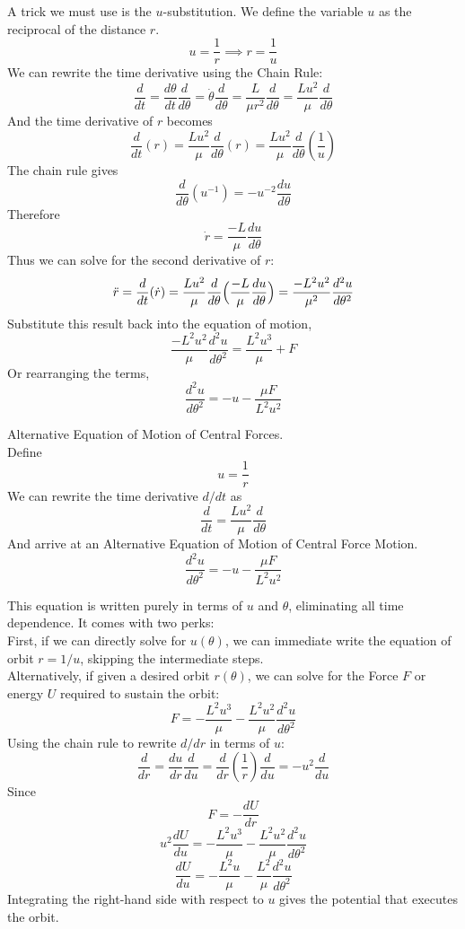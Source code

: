 \documentclass[11pt]{article}
\theoremstyle{gangnamstyle}{\newtheorem{definition}{Definition}[]}
\theoremstyle{gangnamstyle}{\newtheorem{example}{Example}[]}
\theoremstyle{gangnamstyle}{\newtheorem{problem}{Problem}[]}
\theoremstyle{gangnamstyle}{\newtheorem{warning}{Warning}[]}
\begin{document}
A trick we must use is the $u$-substitution. We define the variable $u$ as the reciprocal of the distance $r$. 
\[ u = \frac{1}{r} \implies r = \frac{1}{u} \]
We can rewrite the time derivative using the Chain Rule: 
\[ \frac{d}{dt} = \frac{d\theta}{dt}\frac{d}{d\theta} = \Dot{\theta}\frac{d}{d\theta} = \frac{L}{\mu r^2}\frac{d}{d\theta} = \frac{Lu^2}{\mu}\frac{d}{d\theta} \]
And the time derivative of $r$ becomes
\[ \frac{d}{dt}(r) = \frac{Lu^2}{\mu}\frac{d}{d\theta}(r) = \frac{Lu^2}{\mu}\frac{d}{d\theta}(\frac{1}{u}) \]
The chain rule gives
\[ \frac{d}{d\theta}(u^{-1}) = -u^{-2} \frac{du}{d\theta} \]
Therefore
\[ \Dot{r} = \frac{-L}{\mu}\frac{du}{d\theta} \]
Thus we can solve for the second derivative of $r$: 
\[ \Ddot{r} = \frac{d}{dt}(\Dot{r}) = \frac{Lu^2}{\mu}\frac{d}{d\theta}\Big( \frac{-L}{\mu}\frac{du}{d\theta} \Big) = \frac{-L^2u^2}{\mu^2}\frac{d^2u}{d\theta^2} \]
Substitute this result back into the equation of motion, 
\[ \frac{-L^2u^2}{\mu}\frac{d^2u}{d\theta^2} = \frac{L^2u^3}{\mu} + F \]
Or rearranging the terms,
\[ \frac{d^2u}{d\theta^2} = - u - \frac{\mu F}{L^2u^2} \]

\begin{definition}
Alternative Equation of Motion of Central Forces. \\
Define 
\begin{equation}
u = \frac{1}{r}
\end{equation}
We can rewrite the time derivative $d/dt$ as
\begin{equation}
\frac{d}{dt} = \frac{Lu^2}{\mu}\frac{d}{d\theta}
\end{equation}
And arrive at an Alternative Equation of Motion of Central Force Motion. 
\begin{equation}
\frac{d^2u}{d\theta^2} = - u - \frac{\mu F}{L^2u^2}
\end{equation}
\end{definition}

This equation is written purely in terms of $u$ and $\theta$, eliminating all time dependence. It comes with two perks: \\
First, if we can directly solve for $u(\theta)$, we can immediate write the equation of orbit $r = 1 / u$, skipping the intermediate steps. \\
Alternatively, if given a desired orbit $r(\theta)$, we can solve for the Force $F$ or energy $U$ required to sustain the orbit: 
\[ F = - \frac{L^2u^3}{\mu} -\frac{L^2u^2}{\mu}\frac{d^2u}{d\theta^2} \]
Using the chain rule to rewrite $d/dr$ in terms of $u$:
\[ \frac{d}{dr} = \frac{du}{dr}\frac{d}{du} = \frac{d}{dr}(\frac{1}{r})\frac{d}{du} = -u^2\frac{d}{du} \]
Since
\[ F = - \frac{dU}{dr} \]
\[ u^2\frac{dU}{du} = - \frac{L^2u^3}{\mu} -\frac{L^2u^2}{\mu}\frac{d^2u}{d\theta^2} \]
\[ \frac{dU}{du} = - \frac{L^2u}{\mu} -\frac{L^2}{\mu}\frac{d^2u}{d\theta^2} \]
Integrating the right-hand side with respect to $u$ gives the potential that executes the orbit. 
\end{document}
